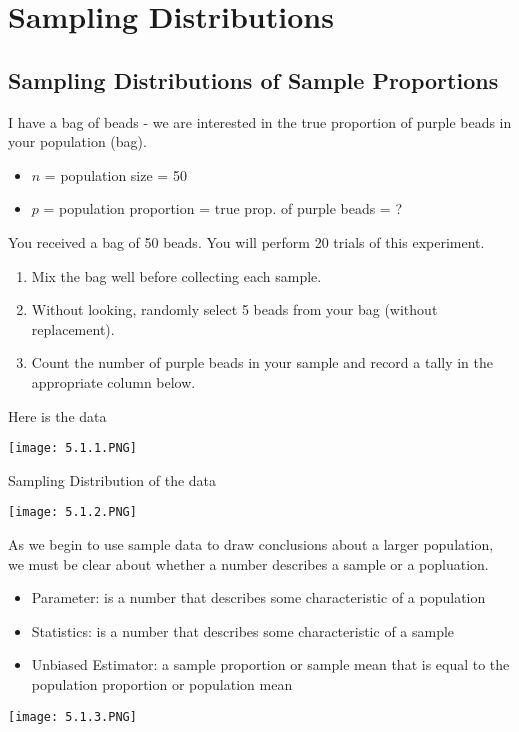 \documentclass[../stats.tex]{subfiles}
\begin{document}
\chapter{Sampling Distributions}
\section{Sampling Distributions of Sample Proportions}
I have a bag of beads - we are interested in the true proportion of purple beads in your population (bag).
\begin{itemize}
    \item $n$ = population size = 50
    \item $p$ = population proportion = true prop. of purple beads = ?
\end{itemize}

You received a bag of 50 beads. You will perform 20 trials of this experiment.
\begin{enumerate}
    \item Mix the bag well before collecting each sample.
    \item Without looking, randomly select 5 beads from your bag (without replacement).
    \item Count the number of purple beads in your sample and record a tally in the appropriate column below.
\end{enumerate}

Here is the data 
\begin{center}
    \texttt{[image: 5.1.1.PNG]}
\end{center}

Sampling Distribution of the data 
\begin{center}
    \texttt{[image: 5.1.2.PNG]}
\end{center}

As we begin to use sample data to draw conclusions about a larger population, we must be clear about whether a number describes a sample or a popluation.
\begin{itemize}
    \item Parameter: is a number that describes some characteristic of a population 
    \item Statistics: is a number that describes some characteristic of a sample 
    \item Unbiased Estimator: a sample proportion or sample mean that is equal to the population proportion or population mean 
\end{itemize}
\begin{center}
    \texttt{[image: 5.1.3.PNG]}
\end{center}
\end{document}
